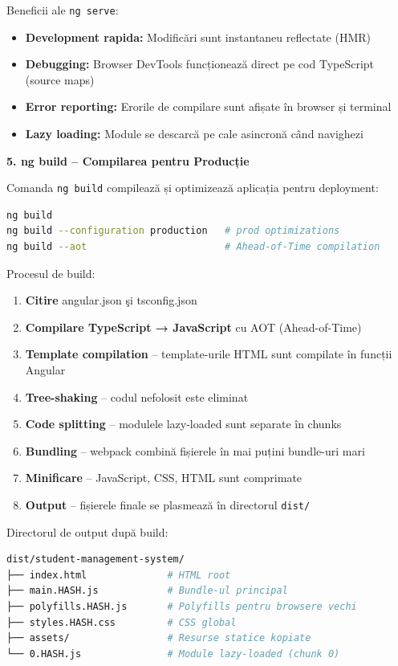 Beneficii ale \texttt{ng serve}:
\begin{itemize}
  \item \textbf{Development rapida:} Modificări sunt instantaneu reflectate (HMR)
  \item \textbf{Debugging:} Browser DevTools funcționează direct pe cod TypeScript (source maps)
  \item \textbf{Error reporting:} Erorile de compilare sunt afișate în browser și terminal
  \item \textbf{Lazy loading:} Module se descarcă pe cale asincronă când navighezi
\end{itemize}

\textbf{5. ng build – Compilarea pentru Producție}

Comanda \texttt{ng build} compilează și optimizează aplicația pentru deployment:

\begin{lstlisting}[language=bash]
ng build
ng build --configuration production   # prod optimizations
ng build --aot                        # Ahead-of-Time compilation
\end{lstlisting}

Procesul de build:

\begin{enumerate}
  \item \textbf{Citire} angular.json şi tsconfig.json
  \item \textbf{Compilare TypeScript → JavaScript} cu AOT (Ahead-of-Time)
  \item \textbf{Template compilation} – template-urile HTML sunt compilate în funcții Angular
  \item \textbf{Tree-shaking} – codul nefolosit este eliminat
  \item \textbf{Code splitting} – modulele lazy-loaded sunt separate în chunks
  \item \textbf{Bundling} – webpack combină fișierele în mai puțini bundle-uri mari
  \item \textbf{Minificare} – JavaScript, CSS, HTML sunt comprimate
  \item \textbf{Output} – fișierele finale se plasmează în directorul \texttt{dist/}
\end{enumerate}

Directorul de output după build:

\begin{lstlisting}[language=bash]
dist/student-management-system/
├── index.html              # HTML root
├── main.HASH.js            # Bundle-ul principal
├── polyfills.HASH.js       # Polyfills pentru browsere vechi
├── styles.HASH.css         # CSS global
├── assets/                 # Resurse statice kopiate
└── 0.HASH.js               # Module lazy-loaded (chunk 0)
\end{lstlisting}

